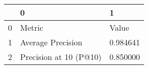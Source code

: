 \begin{tabular}{lll}
\toprule
 & 0 & 1 \\
\midrule
0 & Metric & Value \\
1 & Average Precision & 0.984641 \\
2 & Precision at 10 (P@10) & 0.850000 \\
\bottomrule
\end{tabular}
